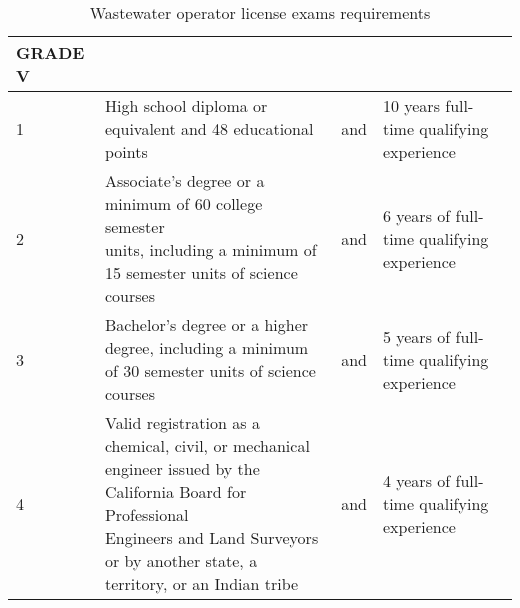 \begin{table}[H]
\begin{tabular}{|l|p{6.5cm}|l|p{6.5cm}|}
GRADE V   &                                                                                                                                                                                                                                                                                               &     &                                                                                                 \\ \hline
1         & High  school  diploma    or  equivalent  and    48 educational points                                                                                                                                                                                                                         & and & 10      years      full-time      qualifying experience                                         \\ \hline
2         & \makecell[l]{Associate’s   degree   or     a  minimum   of     60 college semester \\units, including a minimum of 15 semester units of   science\\courses                                                                                                                                                   } & and & 6    years    of      full-time    qualifying   experience                                      \\ \hline
3         & Bachelor’s   degree   or     a   higher   degree, including a minimum of 30 semester   units of science courses                                                                                                                                                                               & and & 5    years    of      full-time    qualifying   experience                                      \\ \hline
4         & \makecell[l]{Valid  registration  as    a  chemical,  civil,    or mechanical\\ engineer issued by the California  Board  for    Professional\\  Engineers and Land    Surveyors or  by another  state,  a \\territory, or an Indian tribe} & and & 4    years    of      full-time    qualifying   experience                                      \\ \hline
\end{tabular}
\caption{Wastewater operator license exams requirements}
\end{table}

